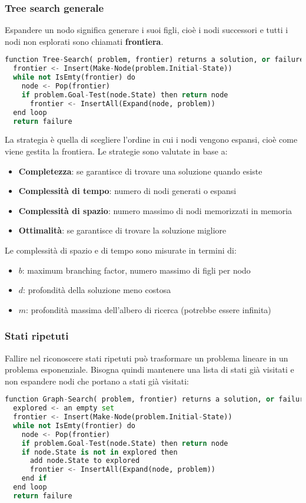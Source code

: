 \documentclass[a4paper]{article}
\begin{document}
\subsubsection{Tree search generale}
Espandere un nodo significa generare i suoi figli, cioè i nodi successori e tutti i nodi
non esplorati sono chiamati \textbf{frontiera}.
\begin{lstlisting}[language=Python]
function Tree-Search( problem, frontier) returns a solution, or failure
  frontier <- Insert(Make-Node(problem.Initial-State))
  while not IsEmty(frontier) do
    node <- Pop(frontier)
    if problem.Goal-Test(node.State) then return node
      frontier <- InsertAll(Expand(node, problem))
  end loop
  return failure
\end{lstlisting}
La strategia è quella di scegliere l'ordine in cui i nodi vengono espansi, cioè
come viene gestita la frontiera. Le strategie sono valutate in base a:
\begin{itemize}
  \item \textbf{Completezza}: se garantisce di trovare una soluzione quando esiste
  \item \textbf{Complessità di tempo}: numero di nodi generati o espansi
  \item \textbf{Complessità di spazio}: numero massimo di nodi memorizzati in memoria
  \item \textbf{Ottimalità}: se garantisce di trovare la soluzione migliore
\end{itemize}
Le complessità di spazio e di tempo sono misurate in termini di:
\begin{itemize}
  \item \( b \): maximum branching factor, numero massimo di figli per nodo
  \item \( d \): profondità della soluzione meno costosa
  \item \( m \): profondità massima dell'albero di ricerca (potrebbe essere infinita)
\end{itemize}

\subsubsection{Stati ripetuti}
Fallire nel riconoscere stati ripetuti può trasformare un problema lineare in un problema
esponenziale. Bisogna quindi mantenere una lista di stati già visitati e non espandere
nodi che portano a stati già visitati:
\begin{lstlisting}[language=Python]
function Graph-Search( problem, frontier) returns a solution, or failure
  explored <- an empty set
  frontier <- Insert(Make-Node(problem.Initial-State))
  while not IsEmty(frontier) do
    node <- Pop(frontier)
    if problem.Goal-Test(node.State) then return node
    if node.State is not in explored then
      add node.State to explored
      frontier <- InsertAll(Expand(node, problem))
    end if
  end loop
  return failure
\end{lstlisting}
\end{document}
